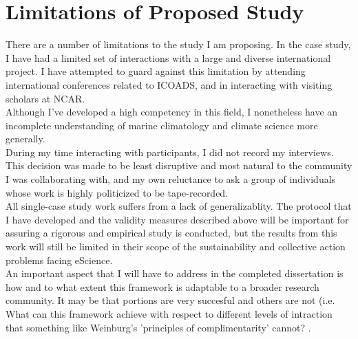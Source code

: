 \documentclass[thesis,tocnosub,noragright,centerchapter,12pt]{uiucecethesis09}
\begin{document}
{\newpage
\section{Limitations of Proposed Study}

There are a number of limitations to the study I am proposing. 
In the case study, I have had a limited set of interactions with a large and
diverse international project. I have attempted to guard against this limitation by attending international conferences related to ICOADS, and in interacting with visiting scholars at NCAR.\\ 

Although I've developed a high competency in this field, I nonetheless have an incomplete understanding of marine
climatology and climate science more generally.\\

During my time interacting with participants, I did not record my interviews. This
decision was made to be least disruptive and most natural to the community I was
collaborating with, and my own reluctance to ask a group of individuals whose
work is highly politicized to be tape-recorded.\\

All single-case study work suffers from a lack of generalizablity. The protocol that I have developed and the validity measures
described above will be important for assuring a rigorous and empirical
study is conducted, but the results from this work will still be limited
in their scope of the sustainability and collective action problems facing eScience.\\ 

An important aspect that I will have to address in the completed dissertation is how and to what extent this framework is adaptable to a broader research community. It may be that portions are very succesful and others are not (i.e. What can this framework achieve with respect to different levels of intraction that something like Weinburg's 'principles of complimentarity' cannot? \citeyearpar{weinberg1975introduction}. \\

\newpage
}
\end{document}
